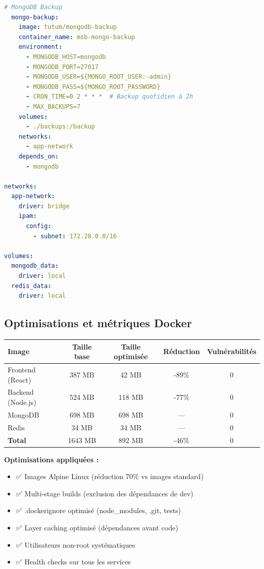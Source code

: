 \begin{exemple}
\begin{lstlisting}[language=yaml]
  # MongoDB Backup
  mongo-backup:
    image: tutum/mongodb-backup
    container_name: msb-mongo-backup
    environment:
      - MONGODB_HOST=mongodb
      - MONGODB_PORT=27017
      - MONGODB_USER=${MONGO_ROOT_USER:-admin}
      - MONGODB_PASS=${MONGO_ROOT_PASSWORD}
      - CRON_TIME=0 2 * * *  # Backup quotidien à 2h
      - MAX_BACKUPS=7
    volumes:
      - ./backups:/backup
    networks:
      - app-network
    depends_on:
      - mongodb

networks:
  app-network:
    driver: bridge
    ipam:
      config:
        - subnet: 172.28.0.0/16

volumes:
  mongodb_data:
    driver: local
  redis_data:
    driver: local
\end{lstlisting}
\end{exemple}

\subsection{Optimisations et métriques Docker}

\begin{tcolorbox}[colback=green!5!white,colframe=green!60!black,title=\textbf{Métriques des images Docker (Décembre 2024)}]
\begin{center}
\begin{tabular}{|l|c|c|c|c|}
\hline
\textbf{Image} & \textbf{Taille base} & \textbf{Taille optimisée} & \textbf{Réduction} & \textbf{Vulnérabilités} \\
\hline
Frontend (React) & 387 MB & 42 MB & -89\% & 0 \\
Backend (Node.js) & 524 MB & 118 MB & -77\% & 0 \\
MongoDB & 698 MB & 698 MB & --- & 0 \\
Redis & 34 MB & 34 MB & --- & 0 \\
\hline
\textbf{Total} & 1643 MB & 892 MB & -46\% & 0 \\
\hline
\end{tabular}
\end{center}

\textbf{Optimisations appliquées :}
\begin{itemize}
    \item ✅ Images Alpine Linux (réduction 70\% vs images standard)
    \item ✅ Multi-stage builds (exclusion des dépendances de dev)
    \item ✅ .dockerignore optimisé (node\_modules, .git, tests)
    \item ✅ Layer caching optimisé (dépendances avant code)
    \item ✅ Utilisateurs non-root systématiques
    \item ✅ Health checks sur tous les services
\end{itemize}
\end{tcolorbox}

